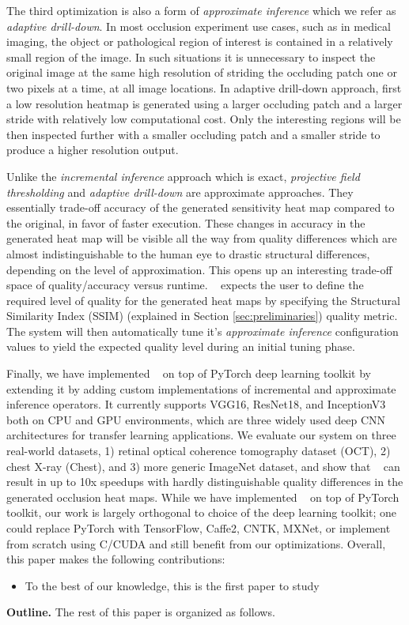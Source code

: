 The third optimization is also a form of \textit{approximate inference} which we refer as \textit{adaptive drill-down}.
In most occlusion experiment use cases, such as in medical imaging, the object or pathological region of interest is contained in a relatively small region of the image.
In such situations it is unnecessary to inspect the original image at the same high resolution of striding the occluding patch one or two pixels at a time, at all image locations.
In adaptive drill-down approach, first a low resolution heatmap is generated using a larger occluding patch and a larger stride with relatively low computational cost.
Only the interesting regions will be then inspected further with a smaller occluding patch and a smaller stride to produce a higher resolution output.

Unlike the \textit{incremental inference} approach which is exact, \textit{projective field thresholding} and \textit{adaptive drill-down} are approximate approaches. They essentially trade-off accuracy of the generated sensitivity heat map compared to the original, in favor of faster execution.
These changes in accuracy in the generated heat map will be visible all the way from quality differences which are almost indistinguishable to the human eye to drastic structural differences, depending on the level of approximation.
This opens up an interesting trade-off space of quality/accuracy versus runtime. \system~ expects the user to define the required level of quality for the generated heat maps by specifying the Structural Similarity Index (SSIM) (explained in Section \ref{sec:preliminaries}) quality metric.
The system will then automatically tune it's \textit{approximate inference} configuration values to yield the expected quality level during an initial tuning phase.

Finally, we have implemented \system~ on top of PyTorch deep learning toolkit by extending it by adding custom implementations of incremental and approximate inference operators.
It currently supports VGG16, ResNet18, and InceptionV3 both on CPU and GPU environments, which are three widely used deep CNN architectures for transfer learning applications.
We evaluate our system on three real-world datasets, 1) retinal optical coherence tomography dataset (OCT), 2) chest X-ray (Chest), and 3) more generic ImageNet dataset, and show that \system~ can result in up to 10x speedups with hardly distinguishable quality differences in the generated occlusion heat maps. While we have implemented \system~ on top of PyTorch toolkit, our work is largely orthogonal to choice of the deep learning toolkit; one could replace PyTorch with TensorFlow, Caffe2, CNTK, MXNet, or implement from scratch using C/CUDA and still benefit from our optimizations.
Overall, this paper makes the following contributions:

\begin{itemize}
	\item To the best of our knowledge, this is the first paper to study
\end{itemize}

\vspace{2mm}
\noindent \textbf{Outline.} The rest of this paper is organized as follows.

